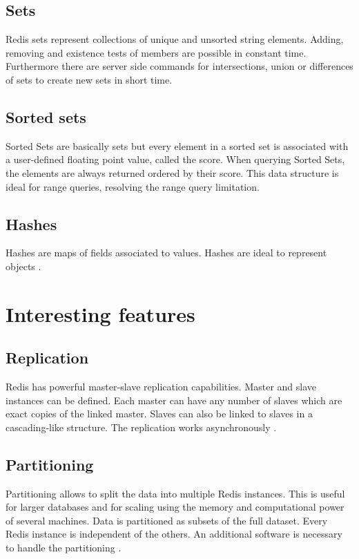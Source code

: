 \subsection{Sets}
Redis sets represent collections of unique and unsorted string elements. Adding,
removing and existence tests of members are possible in constant time.
Furthermore there are server side commands for intersections, union or
differences of sets to create new sets in short time. 

\subsection{Sorted sets}
Sorted Sets are basically sets but every element in a sorted set is associated
with a user-defined floating point value, called the score. When querying Sorted
Sets, the elements are always returned ordered by their score. This data
structure is ideal for range queries, resolving the range query limitation.

\subsection{Hashes}
Hashes are maps of fields associated to values. Hashes are ideal to represent
objects \cite{datatypesredis}.

\section{Interesting features}
\subsection{Replication}
Redis has powerful master-slave replication capabilities. Master and slave
instances can be defined. Each master can have any number of slaves which are
exact copies of the linked master. Slaves can also be linked to slaves in a
cascading-like structure. The replication works asynchronously \cite{replicaredis}.

\subsection{Partitioning}
Partitioning allows to split the data into multiple Redis instances. This is
useful for larger databases and for scaling using the memory and computational
power of several machines. Data is partitioned as subsets of the full dataset.
Every Redis instance is independent of the others. An additional software is
necessary to handle the partitioning \cite{partitionredis}.

